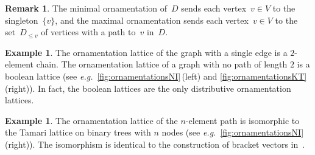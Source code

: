 \documentclass{amsart}
\theoremstyle{definition}
\newtheorem{example}[theorem]{Example}
\newtheorem{remark}[theorem]{Remark}
\renewcommand{\c}[1]{\mathcal{#1}} %
\newcommand{\ssm}{\smallsetminus} %
\newcommand{\eg}{\textit{e.g.}~} %
\newcommand{\lessin}[2]{#1_{\le#2}} %
\DeclareMathOperator{\Orn}{\c{O}}  %
\begin{document}
\begin{remark}
The minimal ornamentation of~$D$ sends each vertex~$v \in V$ to the singleton~$\{v\}$, and the maximal ornamentation sends each vertex~$v \in V$ to the set~$\lessin{D}{v}$ of vertices with a path to~$v$ in~$D$.
\end{remark}

\begin{example}
The ornamentation lattice of the graph with a single edge is a $2$-element chain.
The ornamentation lattice of a graph with no path of length $2$ is a boolean lattice (see \eg \cref{fig:ornamentationsNI}\,(left) and \ref{fig:ornamentationsKT}\,(right)).
In fact, the boolean lattices are the only distributive ornamentation lattices.
\end{example}

\begin{example}
The ornamentation lattice of the $n$-element path is isomorphic to the Tamari lattice on binary trees with $n$ nodes (see \eg \cref{fig:ornamentationsNI}\,(right)).
The isomorphism is identical to the construction of bracket vectors in~\cite{HuangTamari}.
\end{example}

\end{document}

